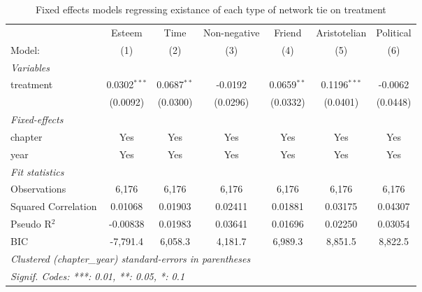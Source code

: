 
\begin{table}[htbp]
   \caption{\label{tab:net_bin} Fixed effects models regressing existance of each type of network tie on treatment}
   \centering
   \begin{tabular}{lcccccc}
      \tabularnewline \midrule \midrule
                          & Esteem         & Time          & Non-negative & Friend        & Aristotelian   & Political \\   
      Model:              & (1)            & (2)           & (3)          & (4)           & (5)            & (6)\\  
      \midrule
      \emph{Variables}\\
      treatment           & 0.0302$^{***}$ & 0.0687$^{**}$ & -0.0192      & 0.0659$^{**}$ & 0.1196$^{***}$ & -0.0062\\   
                          & (0.0092)       & (0.0300)      & (0.0296)     & (0.0332)      & (0.0401)       & (0.0448)\\   
      \midrule
      \emph{Fixed-effects}\\
      chapter             & Yes            & Yes           & Yes          & Yes           & Yes            & Yes\\  
      year                & Yes            & Yes           & Yes          & Yes           & Yes            & Yes\\  
      \midrule
      \emph{Fit statistics}\\
      Observations        & 6,176          & 6,176         & 6,176        & 6,176         & 6,176          & 6,176\\  
      Squared Correlation & 0.01068        & 0.01903       & 0.02411      & 0.01881       & 0.03175        & 0.04307\\  
      Pseudo R$^2$        & -0.00838       & 0.01983       & 0.03641      & 0.01696       & 0.02250        & 0.03054\\  
      BIC                 & -7,791.4       & 6,058.3       & 4,181.7      & 6,989.3       & 8,851.5        & 8,822.5\\  
      \midrule \midrule
      \multicolumn{7}{l}{\emph{Clustered (chapter\_year) standard-errors in parentheses}}\\
      \multicolumn{7}{l}{\emph{Signif. Codes: ***: 0.01, **: 0.05, *: 0.1}}\\
   \end{tabular}
\end{table}


